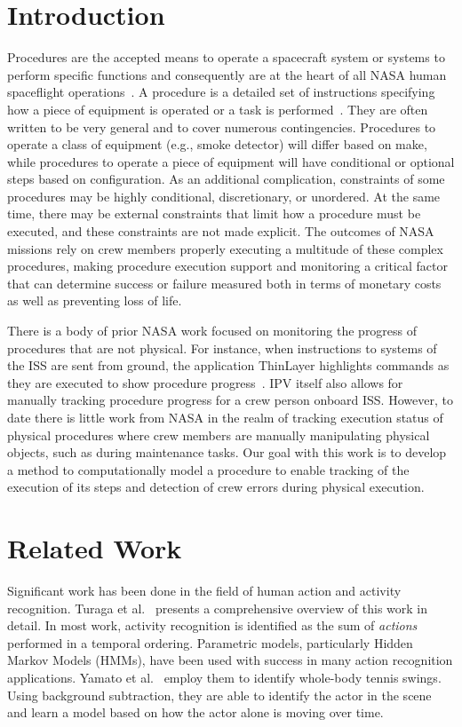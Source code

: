 \documentclass[10pt,twocolumn,letterpaper]{article}
\begin{document}
\section{Introduction}

Procedures are the accepted means to operate a spacecraft system or systems to perform specific functions and consequently are at the heart of all NASA human spaceflight operations~\cite{kortenkamp2008procedure}. A procedure is a detailed set of instructions specifying how a piece of equipment is operated or a task is performed~\cite{frank2010plans}. They are often written to be very general and to cover numerous contingencies. Procedures to operate a class of equipment (e.g., smoke detector) will differ based on make, while procedures to operate a piece of equipment will have conditional or optional steps based on configuration. As an additional complication, constraints of some procedures may be highly conditional, discretionary, or unordered. At the same time, there may be external constraints that limit how a procedure must be executed, and these constraints are not made explicit. The outcomes of NASA missions rely on crew members properly executing a multitude of these complex procedures, making procedure execution support and monitoring a critical factor that can determine success or failure measured both in terms of monetary costs as well as preventing loss of life.

There is a body of prior NASA work focused on monitoring the progress of procedures that are not physical. For instance, when instructions to systems of the ISS are sent from ground, the application ThinLayer highlights commands as they are executed to show procedure progress~\cite{frank2010plans}. IPV itself also allows for manually tracking procedure progress for a crew person onboard ISS. However, to date there is little work from NASA in the realm of tracking execution status of physical procedures where crew members are manually manipulating physical objects, such as during maintenance tasks. Our goal with this work is to develop a method to computationally model a procedure to enable tracking of the execution of its steps and detection of crew errors during physical execution.

\section{Related Work}

Significant work has been done in the field of human action and activity recognition. Turaga et al.~\cite{turaga2008machine} presents a comprehensive overview of this work in detail. In most work, activity recognition is identified as the sum of \emph{actions} performed in a temporal ordering. Parametric models, particularly Hidden Markov Models (HMMs), have been used with success in many action recognition applications. Yamato et al.~\cite{yamato1992recognizing} employ them to identify whole-body tennis swings. Using background subtraction, they are able to identify the actor in the scene and learn a model based on how the actor alone is moving over time.
\end{document}
